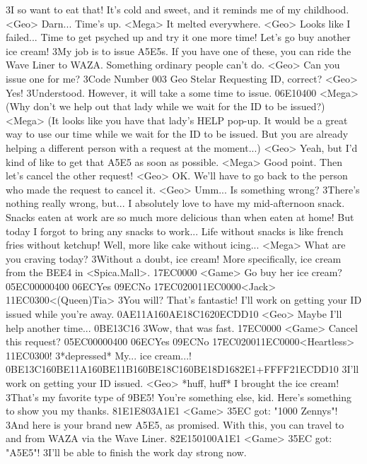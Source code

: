 3I so want to eat that! It's cold and sweet, and it reminds me of my childhood. 
<Geo> Darn... Time's up. 
<Mega> It melted everywhere. 
<Geo> Looks like I failed... 
Time to get psyched up and try it one more time! Let's go buy another ice cream! 
3My job is to issue {A5}{E5}s. 
If you have one of these, you can ride the Wave 
Liner to WAZA. Something ordinary people can't do. 
<Geo> Can you issue one for me? 
3Code Number 003 Geo Stelar 
Requesting ID, correct? 
<Geo> Yes! 
3Understood. However, it will take a some time to issue. 
{06}{E1}{04}{00}
<Mega> (Why don't we help out  that lady while we wait  for the ID to be issued?) 
<Mega> (It looks like you have that  lady's HELP pop-up. It  would be a great way to 
 use our time while we wait  for the ID to be issued. 
 But you are already helping  a different person with a  request at the moment...) 
<Geo> Yeah, but I'd kind of like to get that {A5}{E5} 
as soon as possible. 
<Mega> Good point. Then let's cancel the other request! 
<Geo> OK. We'll have to go back to the person who made the request to cancel it. 
<Geo> Umm... 
Is something wrong? 
3There's nothing really wrong, but... 
I absolutely love to have my mid-afternoon snack. 
Snacks eaten at work are so much more delicious than when eaten at home! 
But today I forgot to bring any snacks to work... 
Life without snacks is like french fries without ketchup! 
Well, more like cake without icing... 
<Mega> What are you craving today? 
3Without a doubt, ice cream! 
More specifically, ice cream from the {BE}{E4} in <Spica.Mall>. 
{17}{EC}{00}{00} 
<Game> Go buy her ice cream? {05}{EC}{00}{00}{04}{00}  {06}{EC}Yes   {09}{EC}No 
{17}{EC}{02}{00}{11}{EC}{00}{00}<Jack> {11}{EC}{03}{00}<(Queen)Tia>
3You will? That's fantastic! 
I'll work on getting your ID issued while you're away. 
{0A}{E1}{1A}{16}{0A}{E1}{8C}{16}{20}{EC}{DD}{10}
<Geo> Maybe I'll help another time... 
{0B}{E1}{3C}{16}
3Wow, that was fast. 
{17}{EC}{00}{00} 
<Game> Cancel this request? {05}{EC}{00}{00}{04}{00}  {06}{EC}Yes   {09}{EC}No 
{17}{EC}{02}{00}{11}{EC}{00}{00}<Heartless> {11}{EC}{03}{00}!
3*depressed* My... ice cream...! 
{0B}{E1}{3C}{16}{0B}{E1}{1A}{16}{0B}{E1}{1B}{16}{0B}{E1}{8C}{16}{0B}{E1}{8D}{16}{82}{E1}+{FF}{FF}{21}{EC}{DD}{10}
3I'll work on getting your ID issued. 
<Geo> *huff, huff* I brought the ice cream! 
3That's my favorite type of {9B}{E5}! 
You're something else, kid. 
Here's something to show you my thanks. 
{81}{E1}{E8}{03}{A1}{E1} 
<Game> {35}{EC} got: "1000 Zennys"! 
3And here is your brand new {A5}{E5}, as promised. 
With this, you can travel to and from WAZA via the Wave Liner. 
{82}{E1}5{01}{00}{A1}{E1} 
<Game> {35}{EC} got: "{A5}{E5}"! 
3I'll be able to finish the work day strong now. 
